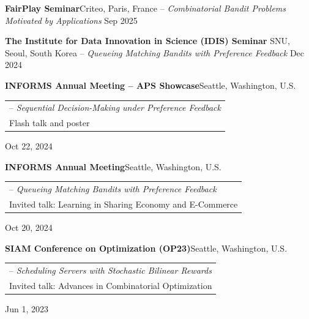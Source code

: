 {\entrybig
    {\textbf{FairPlay Seminar}}{Criteo, Paris, France}
    {\hspace{3mm}-- \emph{Combinatorial Bandit Problems Motivated by Applications}}
    {Sep 2025}

\entrybig
    {\textbf{The Institute for Data Innovation in Science (IDIS) Seminar}}
    {SNU, Seoul, South Korea}
    {\hspace{3mm}-- \emph{Queueing Matching Bandits with Preference Feedback}}
    {Dec 2024}

\entrybig
    {\textbf{INFORMS Annual Meeting -- APS Showcase}}{Seattle, Washington, U.S.}
    {\begin{tabular}[t]{@{}l@{}}
        \hspace{3mm}-- \emph{Sequential Decision-Making under Preference Feedback}\\
        \hspace{7mm}Flash talk and poster
     \end{tabular}}
    {Oct 22, 2024}

\entrybig
    {\textbf{INFORMS Annual Meeting}}{Seattle, Washington, U.S.}
    {\begin{tabular}[t]{@{}l@{}}
        \hspace{3mm}-- \emph{Queueing Matching Bandits with Preference Feedback}\\
        \hspace{7mm}Invited talk: Learning in Sharing Economy and E-Commerce
     \end{tabular}}
    {Oct 20, 2024}

\entrybig
    {\textbf{SIAM Conference on Optimization (OP23)}}{Seattle, Washington, U.S.}
    {\begin{tabular}[t]{@{}l@{}}
        \hspace{3mm}-- \emph{Scheduling Servers with Stochastic Bilinear Rewards}\\
        \hspace{7mm}Invited talk: Advances in Combinatorial Optimization
     \end{tabular}}
    {Jun 1, 2023}

}